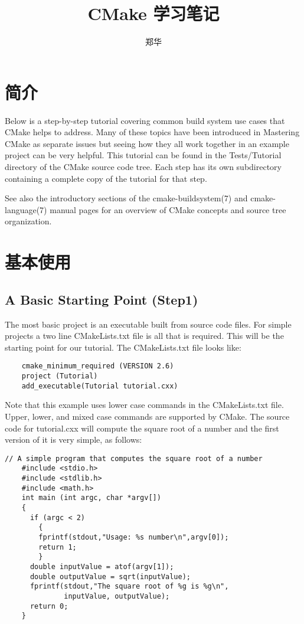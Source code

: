 \documentclass[UTF8,a4paper,8pt]{ctexart}
\author{\kaishu 郑华}
\title{ \textbf{CMake 学习笔记}}
\begin{document}
 	\maketitle
  

\section{简介}
	Below is a step-by-step tutorial covering common build system use cases that CMake helps to address. Many of these topics have been introduced in Mastering CMake as separate issues but seeing how they all work together in an example project can be very helpful. This tutorial can be found in the Tests/Tutorial directory of the CMake source code tree. Each step has its own subdirectory containing a complete copy of the tutorial for that step.
	
	See also the introductory sections of the cmake-buildsystem(7) and cmake-language(7) manual pages for an overview of CMake concepts and source tree organization.


 
\section{基本使用}
\subsection{A Basic Starting Point (Step1)}
	The most basic project is an executable built from source code files. For simple projects a two line CMakeLists.txt file is all that is required. This will be the starting point for our tutorial. The CMakeLists.txt file looks like:
	
	\begin{lstlisting}
	cmake_minimum_required (VERSION 2.6)
	project (Tutorial)
	add_executable(Tutorial tutorial.cxx)	
	\end{lstlisting}
	
	Note that this example uses lower case commands in the CMakeLists.txt file. Upper, lower, and mixed case commands are supported by CMake. The source code for tutorial.cxx will compute the square root of a number and the first version of it is very simple, as follows:
	
	\begin{lstlisting}[frame = lines]
	// A simple program that computes the square root of a number
	#include <stdio.h>
	#include <stdlib.h>
	#include <math.h>
	int main (int argc, char *argv[])
	{
	  if (argc < 2)
	    {
	    fprintf(stdout,"Usage: %s number\n",argv[0]);
	    return 1;
	    }
	  double inputValue = atof(argv[1]);
	  double outputValue = sqrt(inputValue);
	  fprintf(stdout,"The square root of %g is %g\n",
	          inputValue, outputValue);
	  return 0;
	}	
	\end{lstlisting}
\end{document}

